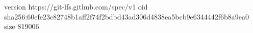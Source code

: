 version https://git-lfs.github.com/spec/v1
oid sha256:60efe23c82748b1aff2f74f2bdbd43ad306d4838ea5bcb9e6344442f6b8a9ea0
size 819006
